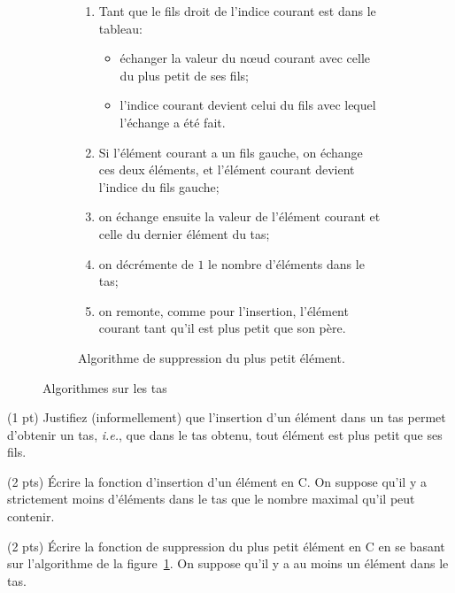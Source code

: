 \begin{figure}
\begin{subfigure}[t]{0.45\textwidth}
{{\begin{enumerate}
          vaut $0$;
        \item Tant que le fils droit de l'indice courant est dans le
          tableau:
          \begin{itemize}
          \item {\'e}changer la valeur du n\oe ud courant avec celle du plus
            petit de ses fils;
          \item l'indice courant devient celui du fils avec lequel
            l'{\'e}change a {\'e}t{\'e} fait.
          \end{itemize}
        \item Si l'{\'e}l{\'e}ment courant a un fils gauche, on {\'e}change ces deux
          {\'e}l{\'e}ments, et l'{\'e}l{\'e}ment courant devient l'indice du fils gauche;
        \item on {\'e}change ensuite la valeur de l'{\'e}l{\'e}ment courant et celle
          du dernier {\'e}l{\'e}ment du tas;
        \item on d{\'e}cr{\'e}mente de $1$ le nombre d'{\'e}l{\'e}ments dans le tas;
        \item on remonte, comme pour l'insertion, l'{\'e}l{\'e}ment courant tant
          qu'il est plus petit que son p{\`e}re.  
        \end{enumerate}}\quad}
    \caption{Algorithme de suppression du plus petit {\'e}l{\'e}ment.}
    \label{fig:tas:suppression}
  \end{subfigure}
  \label{fig:tas:algos}
  \caption{Algorithmes sur les tas}
\end{figure}

\question (1 pt) Justifiez (informellement) que l'insertion d'un
{\'e}l{\'e}ment dans un tas permet d'obtenir un tas, \textit{i.e.}, que dans
le tas obtenu, tout {\'e}l{\'e}ment est plus petit que ses fils.

\question (2 pts) {\'E}crire la fonction d'insertion d'un {\'e}l{\'e}ment en C. On suppose
qu'il y a strictement moins d'{\'e}l{\'e}ments dans le tas que le nombre
maximal qu'il peut contenir.

\question (2 pts) {\'E}crire la fonction de suppression du plus petit
{\'e}l{\'e}ment en C en se basant sur l'algorithme de la
figure~\ref{fig:tas:suppression}. On suppose qu'il y a au moins un
{\'e}l{\'e}ment dans le tas.



